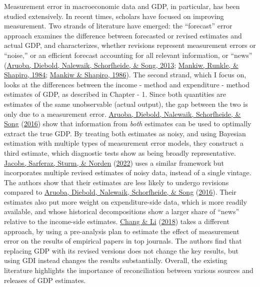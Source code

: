 \documentclass[12pt,nobind, a4paper]{reedthesis}
\begin{document}
 Measurement error in macroeconomic data and GDP, in particular, has been studied extensively. In recent times, scholars have focused on improving measurement. Two strands of literature have emerged: the ``forecast'' error approach examines the difference between forecasted or revised estimates and actual GDP, and characterizes, whether revisions represent measurement errors or ``noise,'' or an efficient forecast accounting for all relevant information, or ``news'' (\protect\hyperlink{ref-aruoba_improving_2013}{Aruoba, Diebold, Nalewaik, Schorfheide, \& Song, 2013}; \protect\hyperlink{ref-mankiw_are_1984}{Mankiw, Runkle, \& Shapiro, 1984}; \protect\hyperlink{ref-mankiw_news_1986}{Mankiw \& Shapiro, 1986}). The second strand, which I focus on, looks at the differences between the income - method and expenditure - method estimates of GDP, as described in Chapter - 1. Since both quantities are estimates of the same unobservable (actual output), the gap between the two is only due to a measurement error. \protect\hyperlink{ref-aruoba_improving_2016}{Aruoba, Diebold, Nalewaik, Schorfheide, \& Song} (\protect\hyperlink{ref-aruoba_improving_2016}{2016}) show that information from \emph{both} estimates can be used to optimally extract the true GDP. By treating both estimates as noisy, and using Bayesian estimation with multiple types of measurement error models, they construct a third estimate, which diagnostic tests show as being broadly representative. \protect\hyperlink{ref-jacobs_can_2022}{Jacobs, Sarferaz, Sturm, \& Norden} (\protect\hyperlink{ref-jacobs_can_2022}{2022}) uses a similar framework but incorporates multiple revised estimates of noisy data, instead of a single vintage. The authors show that their estimates are less likely to undergo revisions compared to \protect\hyperlink{ref-aruoba_improving_2016}{Aruoba, Diebold, Nalewaik, Schorfheide, \& Song} (\protect\hyperlink{ref-aruoba_improving_2016}{2016}). Their estimates also put more weight on expenditure-side data, which is more readily available, and whose historical decompositions show a larger share of ``news'' relative to the income-side estimates. \protect\hyperlink{ref-chang_measurement_2018}{Chang \& Li} (\protect\hyperlink{ref-chang_measurement_2018}{2018}) takes a different approach, by using a pre-analysis plan to estimate the effect of measurement error on the results of empirical papers in top journals. The authors find that replacing GDP with its revised versions does not change the key results, but using GDI instead changes the results substantially. Overall, the existing literature highlights the importance of reconciliation between various sources and releases of GDP estimates.
 \linebreak
\end{document}
